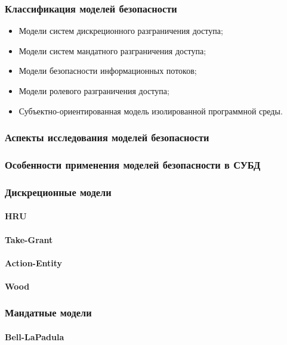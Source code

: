 \subsubsection{Классификация моделей безопасности}

\begin{itemize}
    \item Модели систем дискреционного разграничения доступа;
    \item Модели систем мандатного разграничения доступа;
    \item Модели безопасности информационных потоков;
    \item Модели ролевого разграничения доступа;
    \item Субъектно-ориентированная модель изолированной программной среды.
\end{itemize}

\subsubsection{Аспекты исследования моделей безопасности}
\subsubsection{Особенности применения моделей безопасности в СУБД}

\subsubsection{Дискреционные модели}
\paragraph{HRU}
\paragraph{Take-Grant}
\paragraph{Action-Entity}
\paragraph{Wood}

\subsubsection{Мандатные модели}
\paragraph{Bell-LaPadula}
